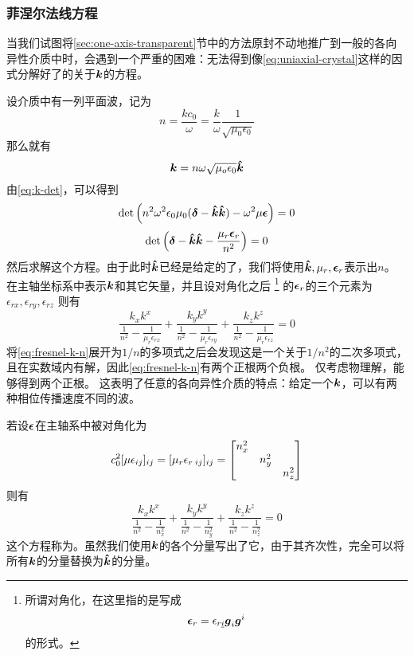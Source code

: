 \subsubsection{菲涅尔法线方程}

当我们试图将\ref{sec:one-axis-transparent}节中的方法原封不动地推广到一般的各向异性介质中时，会遇到一个严重的困难：无法得到像\eqref{eq:uniaxial-crystal}这样的因式分解好了的关于$\vb*{k}$的方程。

设介质中有一列平面波，记为
\begin{equation}
    n = \frac{k c_0}{\omega} = \frac{k}{\omega} \frac{1}{\sqrt{\mu_0 \epsilon_0}}
\end{equation}
那么就有
\[
    \vb*{k} = n \omega \sqrt{\mu_o \epsilon_0} \vu*{k}
\]
由\eqref{eq:k-det}，可以得到
\[
    \det \left( n^2 \omega^2 \epsilon_0 \mu_0 (\vb*{\delta} - \vu*{k} \vu*{k}) - \omega^2 \mu \vb*{\epsilon} \right) = 0
\]
\[
    \det \left( \vb*{\delta} - \vu*{k} \vu*{k} - \frac{\mu_r \vb*{\epsilon}_r}{n^2} \right) = 0
\]
然后求解这个方程。由于此时$\vu*{k}$已经是给定的了，我们将使用$\vu*{k}, \mu_r, \vb*{\epsilon}_r$表示出$n$。
在主轴坐标系中表示$\vb*{k}$和其它矢量，并且设对角化之后%
\footnote{
    所谓对角化，在这里指的是写成
    \[
        \vb*{\epsilon}_r = \epsilon_{r \underline{i}} \vb*{g}_i \vb*{g}^i
    \]
    的形式。
}%
的$\vb*{\epsilon}_r$的三个元素为$\epsilon_{rx}, \epsilon_{ry}, \epsilon_{rz}$
则有
\begin{equation}
    \frac{k_x k^x}{\frac{1}{n^2} - \frac{1}{\mu_r \epsilon_{rx}}} + \frac{k_y k^y}{\frac{1}{n^2} - \frac{1}{\mu_r \epsilon_{ry}}} + \frac{k_z k^z}{\frac{1}{n^2} - \frac{1}{\mu_r \epsilon_{rz}}} = 0
    \label{eq:fresnel-k-n}
\end{equation}
将\eqref{eq:fresnel-k-n}展开为$1/n$的多项式之后会发现这是一个关于$1/n^2$的二次多项式，且在实数域内有解，因此\eqref{eq:fresnel-k-n}有两个正根两个负根。
仅考虑物理解，能够得到两个正根。
这表明了任意的各向异性介质的特点：给定一个$\vb*{k}$，可以有两种相位传播速度不同的波。

若设$\vb*{\epsilon}$在主轴系中被对角化为
\begin{equation}
    c_0^2 [\mu \epsilon_{ij}]_{ij} = [\mu_r \epsilon_{r\;ij}]_{ij} = \bmqty{\dmat{n_x^2, n_y^2, n_z^2}}
    \label{eq:diag-two-axis}
\end{equation}
则有
\begin{equation}
    \frac{k_x k^x}{\frac{1}{n^2} - \frac{1}{n_x^2}} + \frac{k_y k^y}{\frac{1}{n^2} - \frac{1}{n_y^2}} + \frac{k_z k^z}{\frac{1}{n^2} - \frac{1}{n_z^2}} = 0
\end{equation}
这个方程称为。虽然我们使用$\vb*{k}$的各个分量写出了它，由于其齐次性，完全可以将所有$\vb*{k}$的分量替换为$\vu*{k}$的分量。

